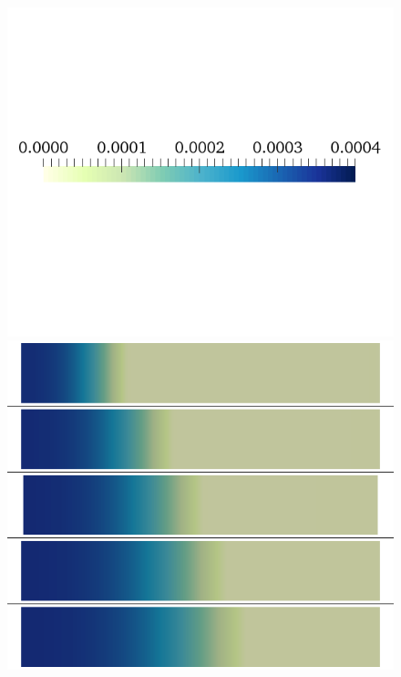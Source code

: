 \documentclass{article}
\begin{document}
\begin{figure}
\begin{minipage}{0.5\textwidth}
\includegraphics[trim=0cm 7cm 0cm 6cm, clip=true, width=1\linewidth]{legend_cai}
\includegraphics[trim=0cm 0cm 0cm 0cm, clip=true, width=1\linewidth]{cai_gna}
    \end{minipage}
    \begin{minipage}{0.5\textwidth}

\end{minipage}
\end{figure}
\end{document}
